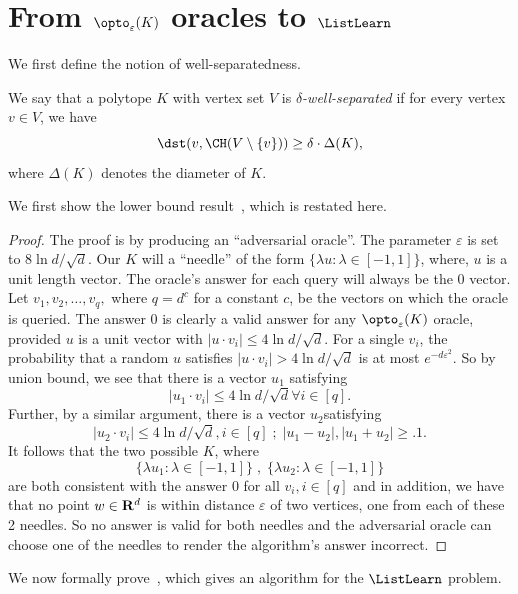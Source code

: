 \section{From $\opto_\varepsilon(K)$ oracles to $\ListLearn$}
\label{sec:listlearn}



We first define the notion of well-separatedness. 
\begin{defn}
    We say that a polytope $K$ with vertex set $V$ is {\em $\delta$-well-separated} if for every vertex $v \in V$, we have
    $$ \dst(v,\CH(V \setminus \{v\})) \geq \delta \cdot \Delta(K),$$
    where $\Delta(K)$ denotes the diameter of $K$.
\end{defn}

We first show the lower bound result~, which is restated here. 

\lowerbound*

\begin{proof}
    The proof is by producing an ``adversarial oracle''. The parameter $\varepsilon$ is set to $8 \ln d/\sqrt{d}$. Our $K$ will a ``needle'' of the form $\{\lambda u:\lambda\in [-1,1]\}$, where, $u$ is a unit length vector. The oracle's answer for each query will  always be the 0 vector. Let  $v_1,v_2,\ldots, v_q,$ where $q=d^c$ for a constant $c$, be the vectors on which the oracle is queried. The answer 0 is clearly a valid answer for any $\opto_\varepsilon(K)$ oracle,  provided  $u$ is a unit vector with $|u\cdot v_i|\leq 4\ln d/\sqrt d$. For a single $v_i$, the probability that a random $u$ satisfies $|u\cdot v_i|>4\ln d/\sqrt d$ is at most $e^{-d\varepsilon^2}$. So by union bound, we see that there is a vector $u_1$ satisfying 
    $$|u_1\cdot v_i|\leq 4\ln d/\sqrt d\forall i\in [q].$$
    Further, by a similar argument, there is a vector $u_2$satisfying
    $$|u_2\cdot v_i|\leq 4\ln d/\sqrt d, i\in [q]\; ;\; |u_1-u_2|,|u_1+u_2|\geq .1.$$ It follows that the two possible $K$, where 
    $$\{ \lambda u_1:\lambda\in [-1,1]\}\; ,\; \{ \lambda u_2:\lambda\in [-1,1]\}$$
are both consistent with the answer 0 for all $v_i,i\in [q]$ and in addition, we have that no point $w\in {\bf R}^d$ is within distance $\varepsilon$ of two vertices, one from each of these 2 needles. So no answer is valid for both needles and the adversarial oracle can choose one of the needles to render the algorithm's answer incorrect.
\end{proof}

We now formally prove~, which gives an algorithm for the $\ListLearn$ problem. 


